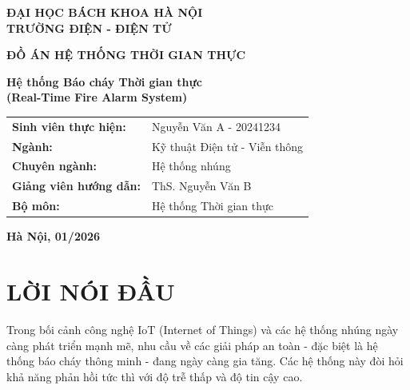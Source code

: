 \documentclass[12pt,a4paper]{report}
\begin{document}
\begin{titlepage}
    \begin{center}
        \textbf{\large ĐẠI HỌC BÁCH KHOA HÀ NỘI}\\
        \textbf{\large TRƯỜNG ĐIỆN - ĐIỆN TỬ}
        
        \vfill 
        
        {\bfseries \Huge ĐỒ ÁN HỆ THỐNG THỜI GIAN THỰC \par}
        
        \vspace{1.5cm} 
        
        {\bfseries \Large Hệ thống Báo cháy Thời gian thực \\ (Real-Time Fire Alarm System) \par}
        
        \vfill 
        
        \begin{tabular}{ll} 
            \textbf{Sinh viên thực hiện:} & Nguyễn Văn A - 20241234\\
                            
            \textbf{Ngành:}               & Kỹ thuật Điện tử - Viễn thông \\
            \textbf{Chuyên ngành:}        & Hệ thống nhúng \\[10pt]
            \textbf{Giảng viên hướng dẫn:}& ThS. Nguyễn Văn B \\
            \textbf{Bộ môn:}              & Hệ thống Thời gian thực
        \end{tabular}

        \vfill 
        
        \textbf{Hà Nội, 01/2026}
    \end{center}
\end{titlepage}

\chapter*{LỜI NÓI ĐẦU}

Trong bối cảnh công nghệ IoT (Internet of Things) và các hệ thống nhúng ngày càng phát triển mạnh mẽ, nhu cầu về các giải pháp an toàn - đặc biệt là hệ thống báo cháy thông minh - đang ngày càng gia tăng. Các hệ thống này đòi hỏi khả năng phản hồi tức thì với độ trễ thấp và độ tin cậy cao.
\end{document}
